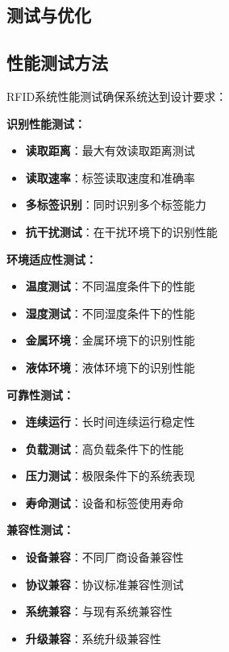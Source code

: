 \documentclass[12pt,UTF8]{ctexbook}
\begin{document}
\begin{itemize}[leftmargin=3.5em]
\begin{itemize}[leftmargin=3.5em]
\begin{itemize}[leftmargin=3.5em]
\begin{itemize}[leftmargin=3.5em]
\chapter{测试与优化}

\section{性能测试方法}

RFID系统性能测试确保系统达到设计要求：

\textbf{识别性能测试：}
\begin{itemize}[leftmargin=3.5em]
    \item \textbf{读取距离}：最大有效读取距离测试
    \item \textbf{读取速率}：标签读取速度和准确率
    \item \textbf{多标签识别}：同时识别多个标签能力
    \item \textbf{抗干扰测试}：在干扰环境下的识别性能
\end{itemize}

\textbf{环境适应性测试：}
\begin{itemize}[leftmargin=3.5em]
    \item \textbf{温度测试}：不同温度条件下的性能
    \item \textbf{湿度测试}：不同湿度条件下的性能
    \item \textbf{金属环境}：金属环境下的识别性能
    \item \textbf{液体环境}：液体环境下的识别性能
\end{itemize}

\textbf{可靠性测试：}
\begin{itemize}[leftmargin=3.5em]
    \item \textbf{连续运行}：长时间连续运行稳定性
    \item \textbf{负载测试}：高负载条件下的性能
    \item \textbf{压力测试}：极限条件下的系统表现
    \item \textbf{寿命测试}：设备和标签使用寿命
\end{itemize}

\textbf{兼容性测试：}
\begin{itemize}[leftmargin=3.5em]
    \item \textbf{设备兼容}：不同厂商设备兼容性
    \item \textbf{协议兼容}：协议标准兼容性测试
    \item \textbf{系统兼容}：与现有系统兼容性
    \item \textbf{升级兼容}：系统升级兼容性
\end{itemize}


\end{itemize}
\end{itemize}
\end{itemize}
\end{itemize}
\end{document}
